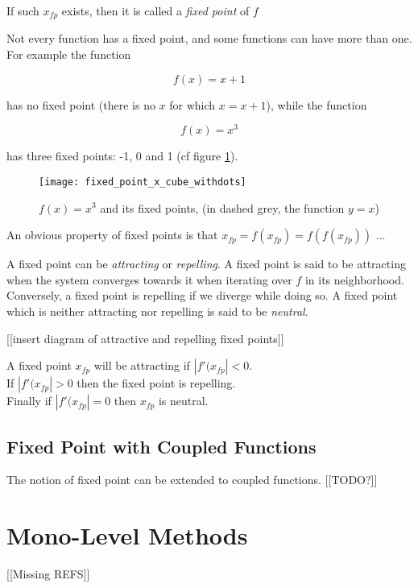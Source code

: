 If such $x_{fp}$ exists, then it is called a \emph{fixed point} of $f$


Not every function has a fixed point, and some functions can have more than one. For example the function

$$f(x)=x+1$$

has no fixed point (there is no $x$ for which $x = x+1$), while the function

$$f(x) = x^3$$

has three fixed points: -1, 0 and 1 (cf figure \ref{fixed_points_x_3}).

\begin{figure}
\centering
\texttt{[image: fixed\_point\_x\_cube\_withdots]}
\caption{$f(x)=x^{3}$ and its fixed points, (in dashed grey, the function $y = x$)}
\label{fixed_points_x_3}
\end{figure}

An obvious property of fixed points is that $x_{fp} = f(x_{fp}) = f(f(x_{fp}))$ ...

A fixed point can be \emph{attracting} or \emph{repelling}. A fixed point is said to be attracting when the system converges towards it when iterating over $f$ in its neighborhood. Conversely, a fixed point is repelling if we diverge while doing so. A fixed point which is neither attracting nor repelling is said to be \emph{neutral}.

[[insert diagram of attractive and repelling fixed points]]

A fixed point $x_{fp}$ will be attracting if $|f'(x_{fp}| < 0$.\\
If $|f'(x_{fp}| > 0$ then the fixed point is repelling.\\
Finally if $|f'(x_{fp}| = 0$ then $x_{fp}$ is neutral.


\subsection{Fixed Point with Coupled Functions}

The notion of fixed point can be extended to coupled functions. [[TODO?]]


\section{Mono-Level Methods}

[[Missing REFS]]

